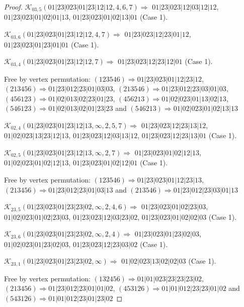 \documentclass[12pt]{article}
\theoremstyle{plain}
\theoremstyle{definition}
\theoremstyle{remark}
\newcommand{\fancy}[1]{\mathcal{#1}}
\def\K{\fancy{K}}
\begin{document}
\begin{proof}
	$\K_{03,5}(01|23|023|01|23|12|12,4, 6, 7)\Rightarrow $ $01|23|023|12|03|12|12$, $01|23|023|01|02|01|13$, $01|23|023|01|02|13|01$ (Case 1).
	
	$\K_{03,6}(01|23|023|01|23|12|12,4, 7)\Rightarrow $ $01|23|023|12|23|01|12$, $01|23|023|01|23|01|01$ (Case 1).
	
	$\K_{03,4}(01|23|023|01|23|12|12,7)\Rightarrow $ $01|23|023|12|23|12|01$ (Case 1).
	
	
	
	Free by vertex permutation: $(1 2 3 5 4 6)\Rightarrow 01|23|023|01|12|23|12$, $(2 1 3 4 5 6)\Rightarrow 01|23|012|23|01|03|03$, $(2 1 3 5 4 6)\Rightarrow 01|23|012|23|03|01|03$, $(4 5 6 1 2 3)\Rightarrow 01|02|013|02|23|01|23$, $(4 5 6 2 1 3)\Rightarrow 01|02|023|01|13|02|13$, $(5 4 6 1 2 3)\Rightarrow 01|02|013|02|01|23|23$ and $(5 4 6 2 1 3)\Rightarrow 01|02|023|01|02|13|13$
	
	
	
	\bigskip
	
	$\K_{02,4}(01|23|023|01|23|12|13,\infty,2, 5, 7)\Rightarrow $ $01|23|023|12|23|13|12$, $01|02|023|13|23|12|13$, $01|23|023|12|03|13|12$, $01|23|023|12|23|13|01$ (Case 1).
	
	$\K_{02,5}(01|23|023|01|23|12|13,\infty,2, 7)\Rightarrow $ $01|23|023|01|02|12|13$, $01|02|023|01|02|12|13$, $01|23|023|01|02|12|01$ (Case 1).
	
	
	
	Free by vertex permutation: $(1 2 3 5 4 6)\Rightarrow 01|23|023|01|12|23|13$, $(2 1 3 4 5 6)\Rightarrow 01|23|012|23|01|03|13$ and $(2 1 3 5 4 6)\Rightarrow 01|23|012|23|03|01|13$
	
	
	
	\bigskip
	
	$\K_{23,5}(01|23|023|01|23|23|02,\infty,2, 4, 6)\Rightarrow $ $01|23|023|01|02|23|03$, $01|02|023|01|02|23|03$, $01|23|023|12|03|23|02$, $01|23|023|01|02|02|03$ (Case 1).
	
	$\K_{23,6}(01|23|023|01|23|23|02,\infty,2, 4)\Rightarrow $ $01|23|023|01|23|02|03$, $01|02|023|01|23|02|03$, $01|23|023|12|23|03|02$ (Case 1).
	
	$\K_{23,1}(01|23|023|01|23|23|02,\infty)\Rightarrow $ $01|02|023|13|02|02|03$ (Case 1).
	
	
	
	Free by vertex permutation: $(1 3 2 4 5 6)\Rightarrow 01|01|023|23|23|23|02$, $(2 1 3 4 5 6)\Rightarrow 01|23|012|23|01|01|02$, $(4 5 3 1 2 6)\Rightarrow 01|01|012|23|23|01|02$ and $(5 4 3 1 2 6)\Rightarrow 01|01|012|23|01|23|02$
	

\end{proof}
\end{document}
